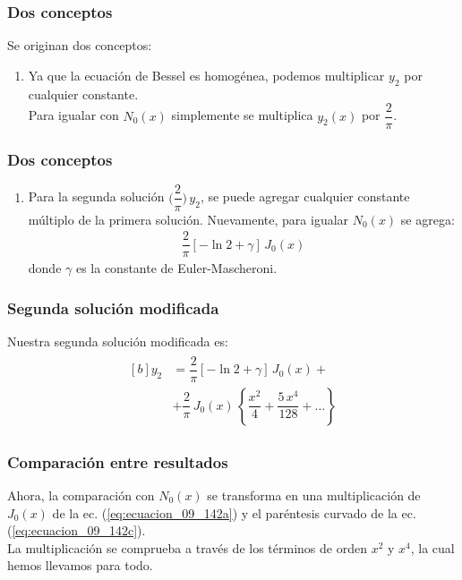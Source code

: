 \documentclass[12pt]{beamer}
\begin{document}
\begin{frame}
\frametitle{Dos conceptos}
Se originan dos conceptos:
\pause
{}
\begin{enumerate}
\item Ya que la ecuación de Bessel es homogénea, podemos multiplicar $y_{2}$ por cualquier constante. 
\\
\bigskip
Para igualar con $N_{0} (x)$ simplemente se multiplica $y_{2} (x)$ por $\dfrac{2}{\pi}$.
\seti
\end{enumerate}
\end{frame}
\begin{frame}
\frametitle{Dos conceptos}
\begin{enumerate}
\conti    
\item Para la segunda solución $\bigg( \dfrac{2}{\pi} \bigg) \, y_{2}$, se puede agregar cualquier constante múltiplo de la primera solución. Nuevamente, para igualar $N_{0} (x)$ se agrega:
\begin{align*}
\dfrac{2}{\pi} [- \ln 2 + \gamma] \, J_{0} (x)
\end{align*}
donde $\gamma$ es la constante de Euler-Mascheroni.
\end{enumerate}
\end{frame}
\begin{frame}
\frametitle{Segunda solución modificada}
Nuestra segunda solución modificada es:
\pause
\begin{eqnarray}
\begin{aligned}[b]
y_{2} &= \dfrac{2}{\pi} [- \ln 2 + \gamma] \, J_{0} (x) + \\[0.5em]
&+ \dfrac{2}{\pi} \, J_{0} (x) \, \left\{ \dfrac{x^{2}}{4} + \dfrac{5 \, x^{4}}{128} + \ldots   \right\}
\end{aligned}
\label{eq:ecuacion_09_142e}
\end{eqnarray}
\end{frame}
\begin{frame}
\frametitle{Comparación entre resultados}
Ahora, la comparación con $N_{0}(x)$ se transforma en una multiplicación de $J_{0}(x)$ de la ec. (\ref{eq:ecuacion_09_142a}) y el paréntesis curvado de la ec. (\ref{eq:ecuacion_09_142c}).
\\
\bigskip
\pause
La multiplicación se comprueba a través de los términos de orden $x^{2}$ y $x^{4}$, la cual hemos llevamos para todo. 
\end{frame}
\end{document}
